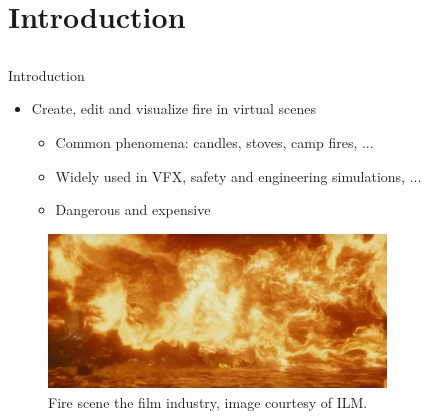 \documentclass{beamer}
\begin{document}
\section{Introduction}
\subsection{ }

\begin{frame}{Introduction}

\begin{itemize}
\setlength\itemsep{0.5em}
\item Create, edit and visualize fire in virtual scenes
		\begin{itemize}
		\setlength\itemsep{0.5em}
		\item Common phenomena: candles, stoves, camp fires, ...
		\item Widely used in VFX, safety and engineering simulations, ...
		\item Dangerous and expensive 
		\end{itemize}
\end{itemize}

\begin{figure}[t!]
\begin{center}
\includegraphics[width=0.8\textwidth]{img/harry_potter_fire} 
\caption*{\tiny{Fire scene the film industry, image courtesy of ILM\footnotemark[1].}}
\end{center}
\end{figure}

\end{frame}
\end{document}
